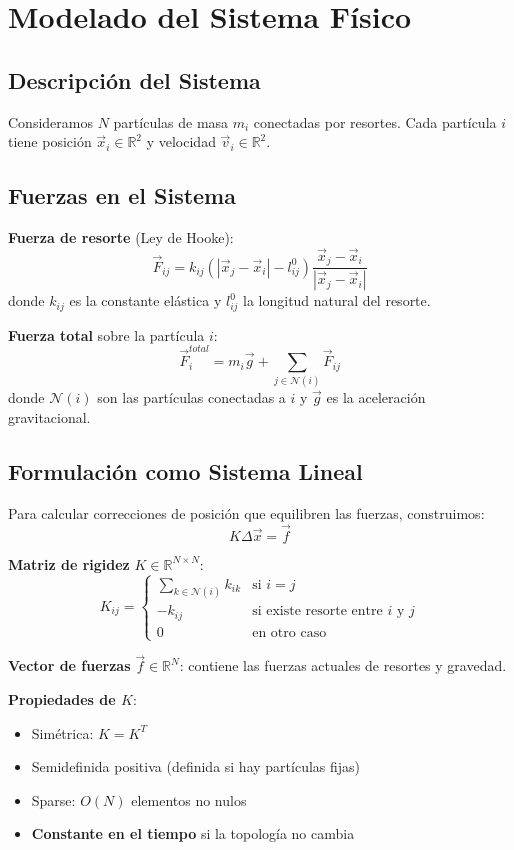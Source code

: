 \documentclass[12pt,a4paper]{article}
\begin{document}
\section{Modelado del Sistema Físico}

\subsection{Descripción del Sistema}

Consideramos \(N\) partículas de masa \(m_i\) conectadas por resortes. Cada partícula \(i\) tiene posición \(\vec{x}_i \in \mathbb{R}^2\) y velocidad \(\vec{v}_i \in \mathbb{R}^2\).

\subsection{Fuerzas en el Sistema}

\textbf{Fuerza de resorte} (Ley de Hooke):
\[
\vec{F}_{ij} = k_{ij}(|\vec{x}_j - \vec{x}_i| - l_{ij}^0) \frac{\vec{x}_j - \vec{x}_i}{|\vec{x}_j - \vec{x}_i|}
\]
donde \(k_{ij}\) es la constante elástica y \(l_{ij}^0\) la longitud natural del resorte.

\textbf{Fuerza total} sobre la partícula \(i\):
\[
\vec{F}_i^{total} = m_i\vec{g} + \sum_{j \in \mathcal{N}(i)} \vec{F}_{ij}
\]
donde \(\mathcal{N}(i)\) son las partículas conectadas a \(i\) y \(\vec{g}\) es la aceleración gravitacional.

\subsection{Formulación como Sistema Lineal}

Para calcular correcciones de posición que equilibren las fuerzas, construimos:
\[
K \Delta\vec{x} = \vec{f}
\]

\textbf{Matriz de rigidez} \(K \in \mathbb{R}^{N \times N}\):
\[
K_{ij} = \begin{cases}
\sum_{k \in \mathcal{N}(i)} k_{ik} & \text{si } i = j \\
-k_{ij} & \text{si existe resorte entre } i \text{ y } j \\
0 & \text{en otro caso}
\end{cases}
\]

\textbf{Vector de fuerzas} \(\vec{f} \in \mathbb{R}^N\): contiene las fuerzas actuales de resortes y gravedad.

\textbf{Propiedades de \(K\)}:
\begin{itemize}
\item Simétrica: \(K = K^T\)
\item Semidefinida positiva (definida si hay partículas fijas)
\item Sparse: \(O(N)\) elementos no nulos
\item \textbf{Constante en el tiempo} si la topología no cambia
\end{itemize}
\end{document}
